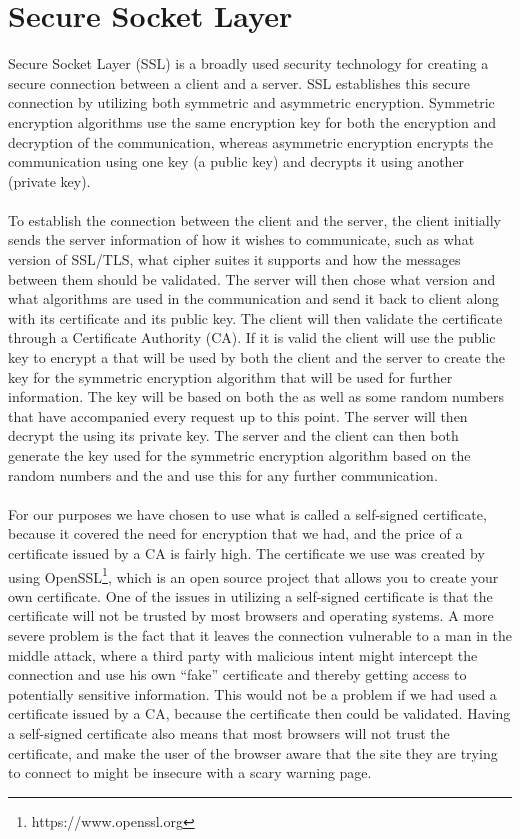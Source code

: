 
\section{Secure Socket Layer}
\label{sec:secure_socket_layer}

Secure Socket Layer (SSL) is a broadly used security technology for creating a secure connection between a client and a server. SSL establishes this secure connection by utilizing both symmetric and asymmetric encryption. Symmetric encryption algorithms use the same encryption key for both the encryption and decryption of the communication, whereas asymmetric encryption encrypts the communication using one key (a public key) and decrypts it using another (private key). 
\\\\
To establish the connection between the client and the server, the client initially sends the server information of how it wishes to communicate, such as what version of SSL/TLS, what cipher suites it supports and how the messages between them should be validated. The server will then chose what version and what algorithms are used in the communication and send it back to client along with its certificate and its public key. The client will then validate the certificate through a Certificate Authority (CA). If it is valid the client will use the public key to encrypt a  that will be used by both the client and the server to create the key for the symmetric encryption algorithm that will be used for further information. The key will be based on both the  as well as some random numbers that have accompanied every request up to this point. The server will then decrypt the  using its private key. The server and the client can then both generate the key used for the symmetric encryption algorithm based on the random numbers and the  and use this for any further communication.
\\\\
For our purposes we have chosen to use what is called a self-signed certificate, because it covered the need for encryption that we had, and the price of a certificate issued by a CA is fairly high. The certificate we use was created by using OpenSSL\footnote{https://www.openssl.org}, which is an open source project that allows you to create your own certificate. One of the issues in utilizing a self-signed certificate is that the certificate will not be trusted by most browsers and operating systems. A more severe problem is the fact that it leaves the connection vulnerable to a man in the middle attack, where a third party with malicious intent might intercept the connection and use his own ``fake'' certificate and thereby getting access to potentially sensitive information. This would not be a problem if we had used a certificate issued by a CA, because the certificate then could be validated. Having a self-signed certificate also means that most browsers will not trust the certificate, and make the user of the browser aware that the site they are trying to connect to might be insecure with a scary warning page. 
